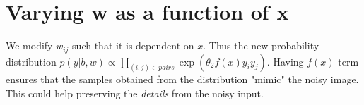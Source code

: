 \documentclass[11pt]{article}
\begin{document}
\begin{figure}[H]
    \centering
\end{figure}

\section{Varying w as a function of x}

We modify $w_{ij}$ such that it is dependent on $x$. Thus the new probability distribution $p(y|b, w) \propto \prod_{(i, j) \in pairs} \exp(\theta_2 f(x) y_i y_j)$. Having $f(x)$ term ensures that the samples obtained from the distribution "mimic" the noisy image. This could help preserving the \textit{details} from the noisy input.
\end{document}
